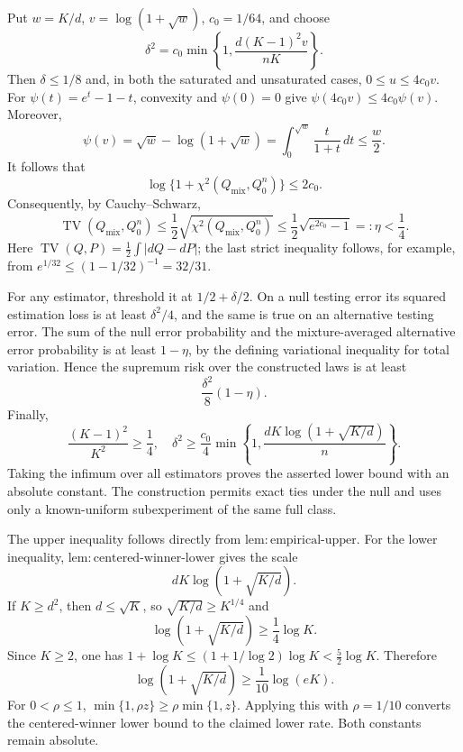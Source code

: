 Put \(w=K/d\), \(v=\log(1+\sqrt w)\), \(c_0=1/64\), and choose
\[
 \delta^2=c_0\min\left\{1,\frac{d(K-1)^2v}{nK}\right\}.
\]
Then \(\delta\leq1/8\) and, in both the saturated and unsaturated cases, \(0\leq u\leq4c_0v\).  For \(\psi(t)=e^t-1-t\), convexity and \(\psi(0)=0\) give \(\psi(4c_0v)\leq4c_0\psi(v)\).  Moreover,
\[
 \psi(v)=\sqrt w-\log(1+\sqrt w)
 =\int_0^{\sqrt w}\frac{t}{1+t}\,dt\leq\frac w2.
\]
It follows that
\[
 \log\{1+\chi^2(Q_{\mathrm{mix}},Q_0^n)\}\leq2c_0.
\]
Consequently, by Cauchy--Schwarz,
\[
 \operatorname{TV}(Q_{\mathrm{mix}},Q_0^n)
 \leq\frac12\sqrt{\chi^2(Q_{\mathrm{mix}},Q_0^n)}
 \leq\frac12\sqrt{e^{2c_0}-1}=: \eta<\frac14.
\]
Here
\(\operatorname{TV}(Q,P)=\frac12\int|dQ-dP|\); the last strict inequality follows, for example, from
\(e^{1/32}\leq(1-1/32)^{-1}=32/31\).

For any estimator, threshold it at \(1/2+\delta/2\).  On a null testing error its squared estimation loss is at least \(\delta^2/4\), and the same is true on an alternative testing error.  The sum of the null error probability and the mixture-averaged alternative error probability is at least \(1-\eta\), by the defining variational inequality for total variation.  Hence the supremum risk over the constructed laws is at least
\[
 \frac{\delta^2}{8}(1-\eta).
\]
Finally,
\[
 \frac{(K-1)^2}{K^2}\geq\frac14,
 \quad
 \delta^2\geq\frac{c_0}{4}
 \min\left\{1,\frac{dK\log(1+\sqrt{K/d})}{n}\right\}.
\]
Taking the infimum over all estimators proves the asserted lower bound with an absolute constant.  The construction permits exact ties under the null and uses only a known-uniform subexperiment of the same full class.

The upper inequality follows directly from \(\mathrm{lem{:}empirical\text{-}upper}\).  For the lower inequality, \(\mathrm{lem{:}centered\text{-}winner\text{-}lower}\) gives the scale
\[
 dK\log(1+\sqrt{K/d}).
\]
If \(K\geq d^2\), then \(d\leq\sqrt K\), so \(\sqrt{K/d}\geq K^{1/4}\) and
\[
 \log(1+\sqrt{K/d})\geq\frac14\log K.
\]
Since \(K\geq2\), one has \(1+\log K\leq(1+1/\log2)\log K<\frac52\log K\).  Therefore
\[
 \log(1+\sqrt{K/d})\geq\frac1{10}\log(eK).
\]
For \(0<\rho\leq1\), \(\min\{1,\rho z\}\geq\rho\min\{1,z\}\).  Applying this with \(\rho=1/10\) converts the centered-winner lower bound to the claimed lower rate.  Both constants remain absolute.

